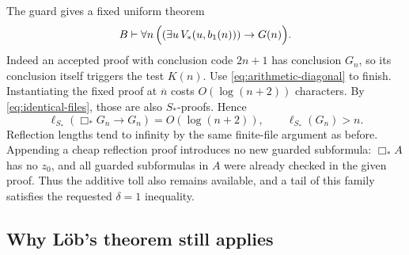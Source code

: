 \documentclass[11pt]{article}
\theoremstyle{remark}
\newcommand{\num}[1]{\overline{#1}}
\begin{document}
The guard gives a fixed uniform theorem
\begin{equation}\label{eq:arithmetic-reflection}
 B\vdash\forall n\,\Bigl((\exists u\,V_*(u,b_1(n)))\to G(n)\Bigr).
\end{equation}
Indeed an accepted proof with conclusion code $2n+1$ has conclusion $G_n$,
so its conclusion itself triggers the test $K(n)$. Use
\eqref{eq:arithmetic-diagonal} to finish. Instantiating the fixed proof at
$\num n$ costs $O(\log(n+2))$ characters. By
\eqref{eq:identical-files}, those are also $S_*$-proofs. Hence
\begin{equation}\label{eq:arithmetic-separation}
 \ell_{S_*}(\Box_*G_n\to G_n)=O(\log(n+2)),\qquad
 \ell_{S_*}(G_n)>n.
\end{equation}
Reflection lengths tend to infinity by the same finite-file argument as
before. Appending a cheap reflection proof introduces no new guarded
subformula: $\Box_*A$ has no $z_0$, and all guarded subformulas in $A$ were
already checked in the given proof. Thus the additive toll also remains
available, and a tail of this family satisfies the requested $\delta=1$
inequality.

\subsection{Why L\"ob's theorem still applies}
\end{document}
